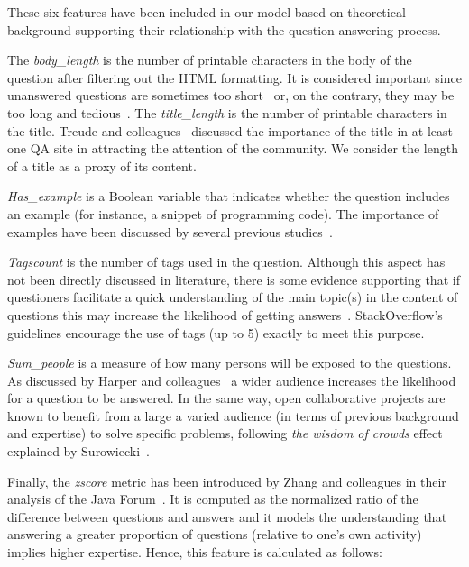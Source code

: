 \documentclass{chi2012}
\begin{document}
These six features have been included in our model based on theoretical
background supporting their relationship with the question answering process.

The \textit{body\_length} is the number of printable characters in the body of the 
question after filtering out the HTML formatting. It is considered important 
since unanswered questions are sometimes too short~\cite{treude2011} or, on 
the contrary, they may be too long and tedious~\cite{mamykina2011}. The 
\textit{title\_length} is the number of printable characters in the title. Treude 
and colleagues~\cite{treude2011} discussed the importance of the title 
in at least one QA site in attracting the attention of the community. We 
consider the length of a title as a proxy of its content.

\textit{Has\_example} is a Boolean variable that indicates whether the question 
includes an example (for instance, a snippet of programming code). The importance 
of examples have been discussed by several previous studies~\cite{asaduzzaman2013,
mamykina2011,treude2011}. 

\textit{Tagscount} is the number of tags used in the question.
Although this aspect has not been directly discussed in literature, there is 
some evidence supporting that if questioners facilitate a quick understanding of the 
main topic(s) in the content of questions this may increase the likelihood of 
getting answers~\cite{treude2011,asaduzzaman2013}. StackOverflow’s 
guidelines encourage the use of tags (up to 5) exactly to meet this purpose.

\textit{Sum\_people} is a measure of how many persons will be exposed to 
the questions. As discussed by Harper and colleagues~\cite{harper2008} a 
wider audience increases the likelihood for a question to be answered. In the same
way, open collaborative projects are known to benefit from a large a varied
audience (in terms of previous background and expertise) to solve specific
problems, following \textit{the wisdom of crowds} effect explained by
Surowiecki~\cite{surowiecki2005}.

Finally, the \textit{zscore} metric has been introduced by Zhang and 
colleagues in their analysis of the Java Forum~\cite{zhang2007}. It is 
computed as the normalized ratio of the difference between questions and answers 
and it models the understanding that answering a greater proportion of 
questions (relative to one’s own activity) implies higher expertise. 
Hence, this feature is calculated as follows:
\end{document}
